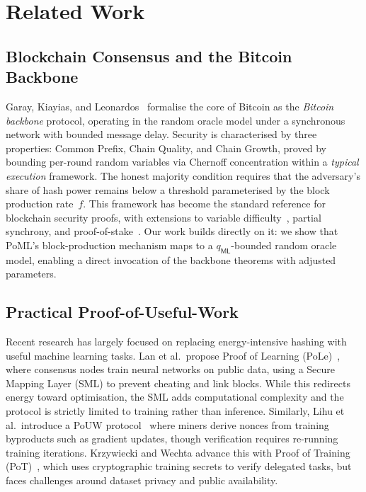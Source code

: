 \section{Related Work}
\label{sec:related}

\subsection{Blockchain Consensus and the Bitcoin Backbone}

Garay, Kiayias, and Leonardos~\cite{GKL20} formalise the core of Bitcoin as the \emph{Bitcoin backbone} protocol, operating in the random oracle model under a synchronous network with bounded message delay. Security is characterised by three properties: Common Prefix, Chain Quality, and Chain Growth, proved by bounding per-round random variables via Chernoff concentration within a \emph{typical execution} framework. The honest majority condition requires that the adversary's share of hash power remains below a threshold parameterised by the block production rate~$f$. This framework has become the standard reference for blockchain security proofs, with extensions to variable difficulty~\cite{GKL17}, partial synchrony, and proof-of-stake~\cite{KRDO17}. Our work builds directly on it: we show that PoML's block-production mechanism maps to a $q_{\mathsf{ML}}$-bounded random oracle model, enabling a direct invocation of the backbone theorems with adjusted parameters.

\subsection{Practical Proof-of-Useful-Work}

Recent research has largely focused on replacing energy-intensive hashing with useful machine learning tasks. Lan et al.\ propose Proof of Learning (PoLe)~\cite{pole}, where consensus nodes train neural networks on public data, using a Secure Mapping Layer (SML) to prevent cheating and link blocks. While this redirects energy toward optimisation, the SML adds computational complexity and the protocol is strictly limited to training rather than inference. Similarly, Lihu et al.\ introduce a PoUW protocol~\cite{pouw} where miners derive nonces from training byproducts such as gradient updates, though verification requires re-running training iterations. Krzywiecki and Wechta advance this with Proof of Training (PoT)~\cite{pot}, which uses cryptographic training secrets to verify delegated tasks, but faces challenges around dataset privacy and public availability.

